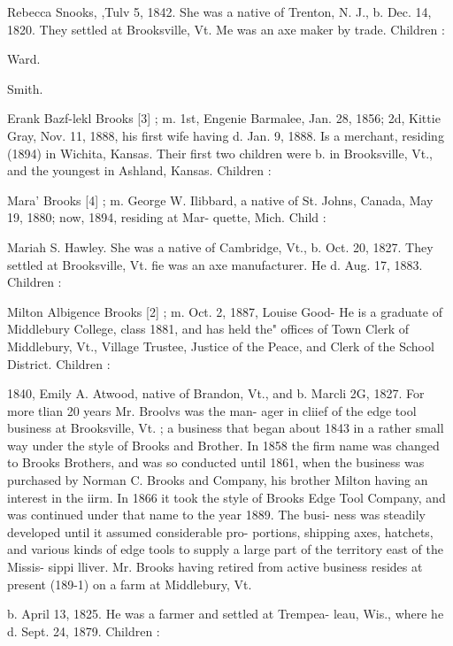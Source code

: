 \documentclass{book}
\begin{document}
Rebecca Snooks, ,Tulv 5, 1842. She was a native of Trenton, 
N. J., b. Dec. 14, 1820. They settled at Brooksville, Vt. Me 
was an axe maker by trade. Children : 


Ward. 


Smith. 



Erank Bazf-lekl Brooks [3] ; m. 1st, Engenie Barmalee, Jan. 
28, 1856; 2d, Kittie Gray, Nov. 11, 1888, his first wife having 
d. Jan. 9, 1888. Is a merchant, residing (1894) in Wichita, 
Kansas. Their first two children were b. in Brooksville, Vt., 
and the youngest in Ashland, Kansas. Children : 




Mara' Brooks [4] ; m. George W. Ilibbard, a native of St. 
Johns, Canada, May 19, 1880; now, 1894, residing at Mar- 
quette, Mich. Child : 




Mariah S. Hawley. She was a native of Cambridge, Vt., b. 
Oct. 20, 1827. They settled at Brooksville, Vt. fie was an 
axe manufacturer. He d. Aug. 17, 1883. Children : 



Milton Albigence Brooks [2] ; m. Oct. 2, 1887, Louise Good- 
He is a graduate of Middlebury College, class 1881, and has 
held the" offices of Town Clerk of Middlebury, Vt., Village 
Trustee, Justice of the Peace, and Clerk of the School District. 
Children : 








1840, Emily A. Atwood, native of Brandon, Vt., and b. Marcli 
2G, 1827. For more tlian 20 years Mr. Broolvs was the man- 
ager in cliief of the edge tool business at Brooksville, Vt. ; a 
business that began about 1843 in a rather small way under 
the style of Brooks and Brother. In 1858 the firm name was 
changed to Brooks Brothers, and was so conducted until 1861, 
when the business was purchased by Norman C. Brooks and 
Company, his brother Milton having an interest in the iirm. 
In 1866 it took the style of Brooks Edge Tool Company, and 
was continued under that name to the year 1889. The busi- 
ness was steadily developed until it assumed considerable pro- 
portions, shipping axes, hatchets, and various kinds of edge 
tools to supply a large part of the territory east of the Missis- 
sippi lliver. Mr. Brooks having retired from active business 
resides at present (189-1) on a farm at Middlebury, Vt. 


b. April 13, 1825. He was a farmer and settled at Trempea- 
leau, Wis., where he d. Sept. 24, 1879. Children : 
\end{document}
